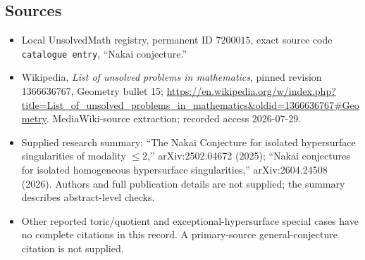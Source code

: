 \documentclass[11pt]{article}
\begin{document}
\subsection{Sources}
\begin{itemize}
\item Local UnsolvedMath registry, permanent ID \(7200015\), exact source code \texttt{catalogue entry}, ``Nakai conjecture.''
\item Wikipedia, \emph{List of unsolved problems in mathematics}, pinned revision 1366636767, Geometry bullet 15; \url{https://en.wikipedia.org/w/index.php?title=List_of_unsolved_problems_in_mathematics&oldid=1366636767#Geometry}. MediaWiki-source extraction; recorded access 2026-07-29.
\item Supplied research summary: ``The Nakai Conjecture for isolated hypersurface singularities of modality \(\le2\),'' arXiv:2502.04672 (2025); ``Nakai conjectures for isolated homogeneous hypersurface singularities,'' arXiv:2604.24508 (2026). Authors and full publication details are not supplied; the summary describes abstract-level checks.
\item Other reported toric/quotient and exceptional-hypersurface special cases have no complete citations in this record. A primary-source general-conjecture citation is not supplied.
\end{itemize}
\end{document}

